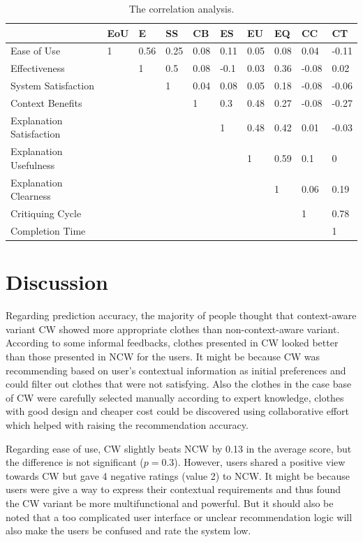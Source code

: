 \begin{table}[H]
	\centering
	\caption{The correlation analysis.}
	\label{tab:correlation}
	\small
	\begin{tabular}{p{1.2in}p{0.3in}p{0.3in}p{0.3in}p{0.3in}p{0.3in}p{0.3in}p{0.3in}p{0.3in}p{0.3in}}
	          \hline
		 & EoU & E & SS & CB & ES & EU & EQ & CC & CT \\ \hline
		Ease of Use & 1 & 0.56 & 0.25 & 0.08 & 0.11 & 0.05 & 0.08 & 0.04 & -0.11 \\
		Effectiveness &  & 1 & 0.5 & 0.08 & -0.1 & 0.03 & 0.36 & -0.08 & 0.02 \\
		System Satisfaction &  &  & 1 & 0.04 & 0.08 & 0.05 & 0.18 & -0.08 & -0.06 \\
		Context Benefits &  &  &  & 1 & 0.3 & 0.48 & 0.27 & -0.08 & -0.27 \\
		Explanation Satisfaction &  &  &  &  & 1 & 0.48 & 0.42 & 0.01 & -0.03 \\
		Explanation Usefulness &  &  &  &  &  & 1 & 0.59 & 0.1 & 0 \\
		Explanation Clearness &  &  &  &  &  &  & 1 & 0.06 & 0.19 \\
		Critiquing Cycle &  &  &  &  &  &  &  & 1 & 0.78 \\
		Completion Time &  &  &  &  &  &  &  &  & 1 \\ \hline
	\end{tabular}
\end{table}

\section{Discussion} \label{sec:discussion}

Regarding prediction accuracy, the majority of people thought that context-aware variant CW showed more appropriate clothes than non-context-aware variant. According to some informal feedbacks, clothes presented in CW looked better than those presented in NCW for the users. It might be because CW was recommending based on user's contextual information as initial preferences and could filter out clothes that were not satisfying. Also the clothes in the case base of CW were carefully selected manually according to expert knowledge, clothes with good design and cheaper cost could be discovered using collaborative effort which helped with raising the recommendation accuracy.

Regarding ease of use, CW slightly beats NCW by 0.13 in the average score, but the difference is not significant ($p=0.3$). However, users shared a positive view towards CW but gave 4 negative ratings (value 2) to NCW. It might be because users were give a way to express their contextual requirements and thus found the CW variant be more multifunctional and powerful. But it should also be noted that a too complicated user interface or unclear recommendation logic will also make the users be confused and rate the system low.

